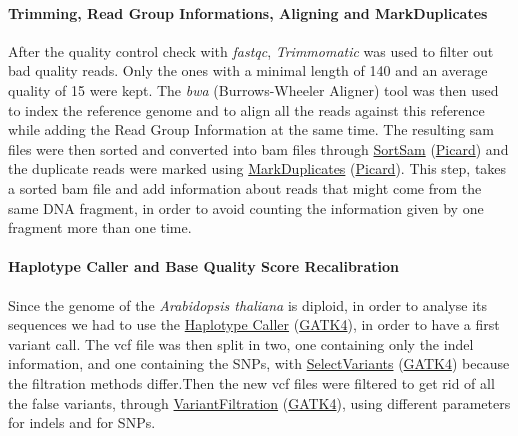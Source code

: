\documentclass[10pt,a4paper]{article}
\begin{document}
\paragraph{Trimming, Read Group Informations, Aligning and MarkDuplicates} After the quality control check with \textit{fastqc}, \textit{Trimmomatic}\cite{bolger_trimmomatic:_2014} was used to filter out bad quality reads. Only the ones with a minimal length of 140 and an average quality of 15 were kept. The \textit{bwa} (Burrows-Wheeler Aligner) tool was then used to index the reference genome
and to align all the reads against this reference while adding the Read Group Information at the same time. The resulting sam files were then sorted and converted into bam files through  \href{https://software.broadinstitute.org/gatk/documentation/tooldocs/4.0.8.0/picard_sam_SortSam.php}{SortSam} (\href{https://broadinstitute.github.io/picard/}{Picard}) and the duplicate reads were marked using  \href{https://software.broadinstitute.org/gatk/documentation/tooldocs/4.0.4.0/picard_sam_markduplicates_MarkDuplicates.php}{MarkDuplicates} (\href{https://broadinstitute.github.io/picard/}{Picard}). This step, takes a sorted bam file and  add information about reads that might come from the same DNA fragment, in order to avoid counting the information given by one fragment more than one time. 

\paragraph{Haplotype Caller and Base Quality Score Recalibration} Since the genome of the \textit{Arabidopsis thaliana} is diploid, in order to analyse its sequences we had to use the \href{https://software.broadinstitute.org/gatk/documentation/tooldocs/3.8-0/org_broadinstitute_gatk_tools_walkers_haplotypecaller_HaplotypeCaller.php}{Haplotype Caller} (\href{https://software.broadinstitute.org/gatk/}{GATK4}), in order to have a first variant call. The vcf file was then split in two, one containing only the indel information, and one containing the SNPs, with  \href{https://software.broadinstitute.org/gatk/documentation/tooldocs/3.8-0/org_broadinstitute_gatk_tools_walkers_variantutils_SelectVariants.php}{SelectVariants} (\href{https://software.broadinstitute.org/gatk/}{GATK4}) because the filtration methods differ.Then the new vcf files were filtered to get rid of all the false variants, through  \href{https://software.broadinstitute.org/gatk/documentation/tooldocs/3.8-0/org_broadinstitute_gatk_tools_walkers_filters_VariantFiltration.php}{VariantFiltration} (\href{https://software.broadinstitute.org/gatk/}{GATK4}), using different parameters for indels and for SNPs.
\end{document}
